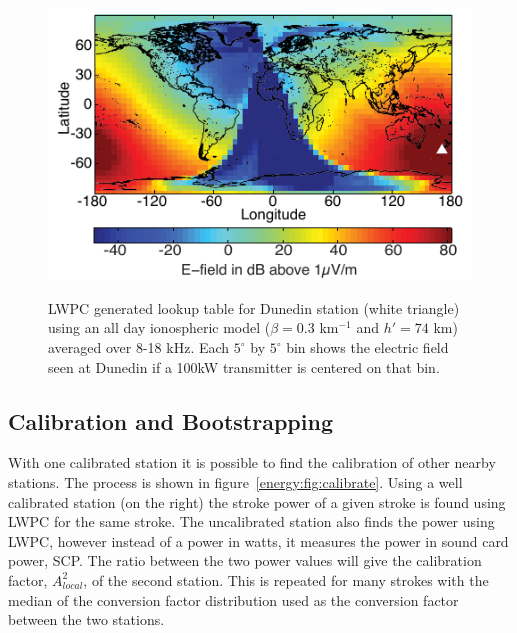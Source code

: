 \begin{figure}[ht!]
\centering
\includegraphics[scale=1]{energy/Figures/PPS_Lookup.pdf}\\
\caption{LWPC generated lookup table for Dunedin station (white triangle) using an all day ionospheric model ($\beta=0.3$ km$^{-1}$ and $h'=74$ km) averaged over 8-18 kHz. Each $5^{\circ}$ by $5^{\circ}$ bin shows the electric field seen at Dunedin if a 100kW transmitter is centered on that bin.}
\label{energy:fig:lookup}
\end{figure}

\subsection{Calibration and Bootstrapping}

With one calibrated station it is possible to find the calibration of other nearby stations.
The process is shown in figure~\ref{energy:fig:calibrate}.
Using a well calibrated station (on the right) the stroke power of a given stroke is found using LWPC for the same stroke.
The uncalibrated station also finds the power using LWPC, however instead of a power in watts, it measures the power in sound card power, SCP.
The ratio between the two power values will give the calibration factor, $A_{local}^2$, of the second station.
This is repeated for many strokes with the median of the conversion factor distribution used as the conversion factor between the two stations.

